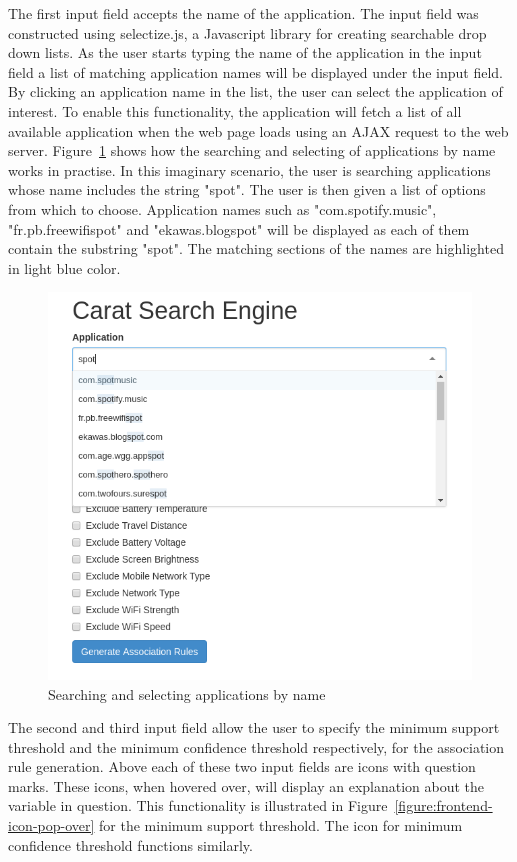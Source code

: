 The first input field accepts the name of the application. The input field was constructed using selectize.js, a Javascript library for creating searchable drop down lists. As the user starts typing the name of the application in the input field a list of matching application names will be displayed under the input field. By clicking an application name in the list, the user can select the application of interest. To enable this functionality, the application will fetch a list of all available application  when the web page loads using an AJAX request to the web server. Figure~\ref{figure:frontend-selectize} shows how the searching and selecting of applications by name works in practise. In this imaginary scenario, the user is searching applications whose name includes the string "spot". The user is then given a list of options from which to choose. Application names such as "com.spotify.music", "fr.pb.freewifispot" and "ekawas.blogspot" will be displayed as each of them contain the substring "spot". The matching sections of the names are highlighted in light blue color.    

\begin{figure} %
	\centering
	\includegraphics[width=\textwidth]{images/frontend/frontend_selectize.png}
	\caption{Searching and selecting applications by name}
	\label{figure:frontend-selectize}
\end{figure} 

The second and third input field allow the user to specify the minimum support threshold and the minimum confidence threshold respectively, for the association rule generation. Above each of these two input fields are icons with question marks. These icons, when hovered over, will display an explanation about the variable in question. This functionality is illustrated in Figure~\ref{figure:frontend-icon-pop-over} for the minimum support threshold. The icon for minimum confidence threshold functions similarly. 

